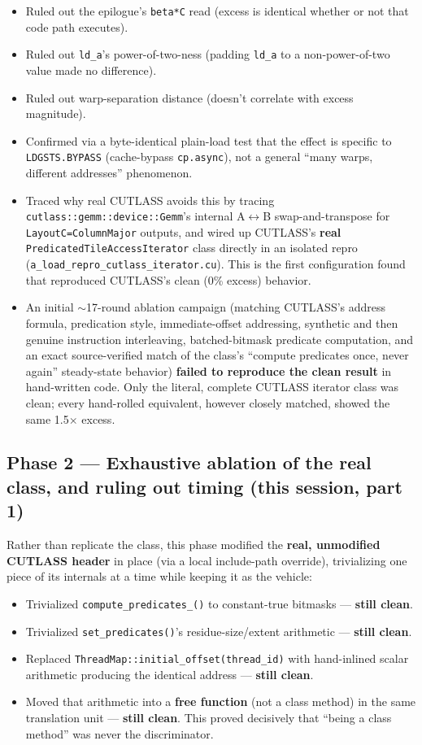 \documentclass[11pt]{article}
\begin{document}
\begin{itemize}
\item Ruled out the epilogue's \texttt{beta*C} read (excess is identical whether or not that code path executes).
\item Ruled out \texttt{ld\_a}'s power-of-two-ness (padding \texttt{ld\_a} to a non-power-of-two value made no difference).
\item Ruled out warp-separation distance (doesn't correlate with excess magnitude).
\item Confirmed via a byte-identical plain-load test that the effect is specific to \texttt{LDGSTS.BYPASS} (cache-bypass \texttt{cp.async}), not a general ``many warps, different addresses'' phenomenon.
\item Traced why real CUTLASS avoids this by tracing \texttt{cutlass::gemm::device::Gemm}'s internal A$\leftrightarrow$B swap-and-transpose for \texttt{LayoutC=ColumnMajor} outputs, and wired up CUTLASS's \textbf{real} \texttt{PredicatedTileAccessIterator} class directly in an isolated repro (\texttt{a\_load\_repro\_cutlass\_iterator.cu}). This is the first configuration found that reproduced CUTLASS's clean (0\% excess) behavior.
\item An initial $\sim$17-round ablation campaign (matching CUTLASS's address formula, predication style, immediate-offset addressing, synthetic and then genuine instruction interleaving, batched-bitmask predicate computation, and an exact source-verified match of the class's ``compute predicates once, never again'' steady-state behavior) \textbf{failed to reproduce the clean result} in hand-written code. Only the literal, complete CUTLASS iterator class was clean; every hand-rolled equivalent, however closely matched, showed the same 1.5$\times$ excess.
\end{itemize}

\subsection{Phase 2 --- Exhaustive ablation of the real class, and ruling out timing (this session, part 1)}

Rather than replicate the class, this phase modified the \textbf{real, unmodified CUTLASS header} in place (via a local include-path override), trivializing one piece of its internals at a time while keeping it as the vehicle:

\begin{itemize}
\item Trivialized \texttt{compute\_predicates\_()} to constant-true bitmasks --- \textbf{still clean}.
\item Trivialized \texttt{set\_predicates()}'s residue-size/extent arithmetic --- \textbf{still clean}.
\item Replaced \texttt{ThreadMap::initial\_offset(thread\_id)} with hand-inlined scalar arithmetic producing the identical address --- \textbf{still clean}.
\item Moved that arithmetic into a \textbf{free function} (not a class method) in the same translation unit --- \textbf{still clean}. This proved decisively that ``being a class method'' was never the discriminator.
\end{itemize}
\end{document}
